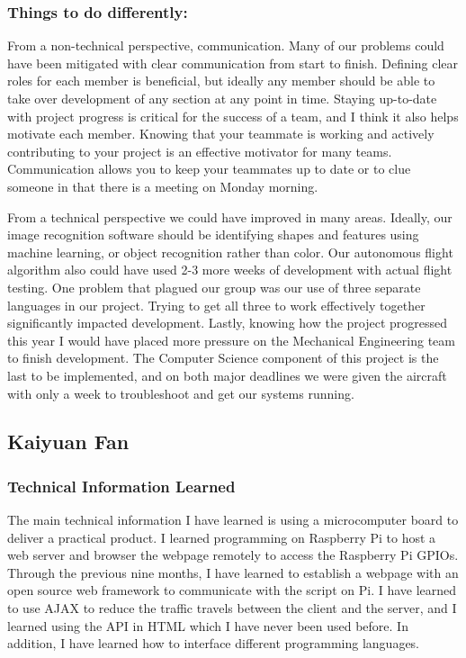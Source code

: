 \documentclass[onecolumn, draftclsnofoot,10pt, compsoc]{IEEEtran}
\begin{document}
\subsubsection{Things to do differently:}
From a non-technical perspective, communication. Many of our problems could have been mitigated with clear communication from start to finish. Defining clear roles for each member is beneficial, but ideally any member should be able to take over development of any section at any point in time. Staying up-to-date with project progress is critical for the success of a team, and I think it also helps motivate each member. Knowing that your teammate is working and actively contributing to your project is an effective motivator for many teams. Communication allows you to keep your teammates up to date or to clue someone in that there is a meeting on Monday morning.

From a technical perspective we could have improved in many areas. Ideally, our image recognition software should be identifying shapes and features using machine learning, or object recognition rather than color. Our autonomous flight algorithm also could have used 2-3 more weeks of development with actual flight testing. One problem that plagued our group was our use of three separate languages in our project. Trying to get all three to work effectively together significantly impacted development. Lastly, knowing how the project progressed this year I would have placed more pressure on the Mechanical Engineering team to finish development. The Computer Science component of this project is the last to be implemented, and on both major deadlines we were given the aircraft with only a week to troubleshoot and get our systems running. 


\subsection{Kaiyuan Fan}
\subsubsection{Technical Information Learned}
The main technical information I have learned is using a microcomputer board to deliver a practical product. I learned programming on Raspberry Pi to host a web server and browser the webpage remotely to access the Raspberry Pi GPIOs. Through the previous nine months, I have learned to establish a webpage with an open source web framework to communicate with the script on Pi. I have learned to use AJAX to reduce the traffic travels between the client and the server, and I learned using the API in HTML which I have never been used before. In addition, I have learned how to interface different programming languages.
\end{document}
